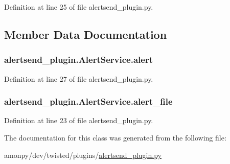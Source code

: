 Definition at line 25 of file alertsend\-\_\-plugin.\-py.



\subsection{Member Data Documentation}
\hypertarget{classalertsend__plugin_1_1_alert_service_a91b88386bc56aabc6e5e0477eb4f5946}{
\subsubsection[{alert}]{\setlength{\rightskip}{0pt plus 5cm}alertsend\-\_\-plugin.\-Alert\-Service.\-alert}}\label{classalertsend__plugin_1_1_alert_service_a91b88386bc56aabc6e5e0477eb4f5946}


Definition at line 27 of file alertsend\-\_\-plugin.\-py.

\hypertarget{classalertsend__plugin_1_1_alert_service_acc72890f5638b996635878a4b21f7f2b}{
\subsubsection[{alert\-\_\-file}]{\setlength{\rightskip}{0pt plus 5cm}alertsend\-\_\-plugin.\-Alert\-Service.\-alert\-\_\-file}}\label{classalertsend__plugin_1_1_alert_service_acc72890f5638b996635878a4b21f7f2b}


Definition at line 23 of file alertsend\-\_\-plugin.\-py.



The documentation for this class was generated from the following file\-:\begin{DoxyCompactItemize}
\item 
amonpy/dev/twisted/plugins/\hyperlink{alertsend__plugin_8py}{alertsend\-\_\-plugin.\-py}\end{DoxyCompactItemize}
